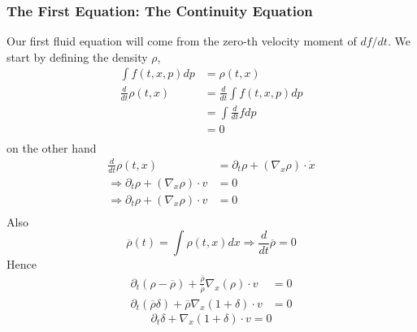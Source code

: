 \subsubsection{The First Equation: The Continuity Equation}
Our first fluid equation will come from the zero-th velocity moment of $df/dt$. We start by defining the density $\rho$,
\begin{equation}
	\begin{split}
		\int f(t,x,p)dp &= \rho(t,x) \\
		\frac{d}{dt}\rho(t,x) &= \frac{d}{dt}\int f(t,x,p) dp \\
		                      &= \int \frac{d}{dt} f dp \\
		                      &= 0 \\		                     
	\end{split}
\end{equation}
on the other hand
\begin{equation}
	\begin{split}
		\frac{d}{dt}\rho(t,x) &= \partial_t \rho + (\nabla_x\rho) \cdot \dot x \\
		\Rightarrow \partial_t\rho + (\nabla_x\rho) \cdot v  &= 0 \\
		\Rightarrow \partial_t \rho + (\nabla_x \rho) \cdot v &= 0 \\
	\end{split}
\end{equation}
Also
\begin{equation}
	\overline\rho(t) = \int\rho(t,x)dx \Rightarrow \frac{d}{dt}\overline{\rho} = 0
\end{equation}
Hence
\begin{equation}
	\begin{split}
		\partial_t (\rho - \overline{\rho}) + \frac{\overline{\rho}}{\overline{\rho}}\nabla_x(\rho) \cdot v &= 0 \\
		\partial_t (\overline{\rho} \delta) + \overline{\rho}\nabla_x (1+\delta) \cdot v &=0
	\end{split}
\end{equation}
\begin{equation}
	\partial_t \delta + \nabla_x (1+\delta) \cdot v =0
\end{equation}

